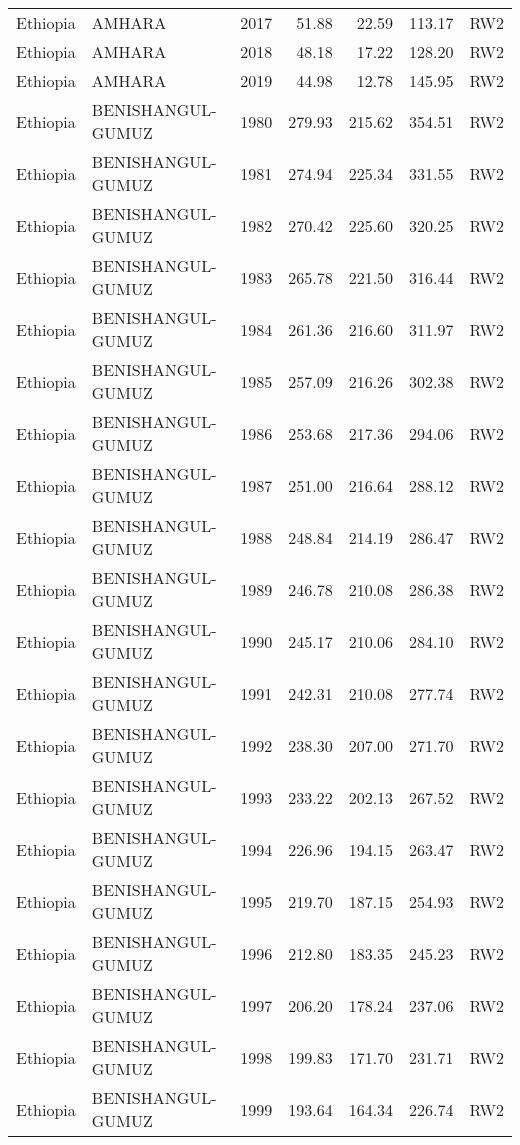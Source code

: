 \begin{longtable}{lllrrrl}
  Ethiopia & AMHARA & 2017 & 51.88 & 22.59 & 113.17 & RW2 \\ 
  Ethiopia & AMHARA & 2018 & 48.18 & 17.22 & 128.20 & RW2 \\ 
  Ethiopia & AMHARA & 2019 & 44.98 & 12.78 & 145.95 & RW2 \\ 
  Ethiopia & BENISHANGUL-GUMUZ & 1980 & 279.93 & 215.62 & 354.51 & RW2 \\ 
  Ethiopia & BENISHANGUL-GUMUZ & 1981 & 274.94 & 225.34 & 331.55 & RW2 \\ 
  Ethiopia & BENISHANGUL-GUMUZ & 1982 & 270.42 & 225.60 & 320.25 & RW2 \\ 
  Ethiopia & BENISHANGUL-GUMUZ & 1983 & 265.78 & 221.50 & 316.44 & RW2 \\ 
  Ethiopia & BENISHANGUL-GUMUZ & 1984 & 261.36 & 216.60 & 311.97 & RW2 \\ 
  Ethiopia & BENISHANGUL-GUMUZ & 1985 & 257.09 & 216.26 & 302.38 & RW2 \\ 
  Ethiopia & BENISHANGUL-GUMUZ & 1986 & 253.68 & 217.36 & 294.06 & RW2 \\ 
  Ethiopia & BENISHANGUL-GUMUZ & 1987 & 251.00 & 216.64 & 288.12 & RW2 \\ 
  Ethiopia & BENISHANGUL-GUMUZ & 1988 & 248.84 & 214.19 & 286.47 & RW2 \\ 
  Ethiopia & BENISHANGUL-GUMUZ & 1989 & 246.78 & 210.08 & 286.38 & RW2 \\ 
  Ethiopia & BENISHANGUL-GUMUZ & 1990 & 245.17 & 210.06 & 284.10 & RW2 \\ 
  Ethiopia & BENISHANGUL-GUMUZ & 1991 & 242.31 & 210.08 & 277.74 & RW2 \\ 
  Ethiopia & BENISHANGUL-GUMUZ & 1992 & 238.30 & 207.00 & 271.70 & RW2 \\ 
  Ethiopia & BENISHANGUL-GUMUZ & 1993 & 233.22 & 202.13 & 267.52 & RW2 \\ 
  Ethiopia & BENISHANGUL-GUMUZ & 1994 & 226.96 & 194.15 & 263.47 & RW2 \\ 
  Ethiopia & BENISHANGUL-GUMUZ & 1995 & 219.70 & 187.15 & 254.93 & RW2 \\ 
  Ethiopia & BENISHANGUL-GUMUZ & 1996 & 212.80 & 183.35 & 245.23 & RW2 \\ 
  Ethiopia & BENISHANGUL-GUMUZ & 1997 & 206.20 & 178.24 & 237.06 & RW2 \\ 
  Ethiopia & BENISHANGUL-GUMUZ & 1998 & 199.83 & 171.70 & 231.71 & RW2 \\ 
  Ethiopia & BENISHANGUL-GUMUZ & 1999 & 193.64 & 164.34 & 226.74 & RW2 \\ 

\end{longtable}
